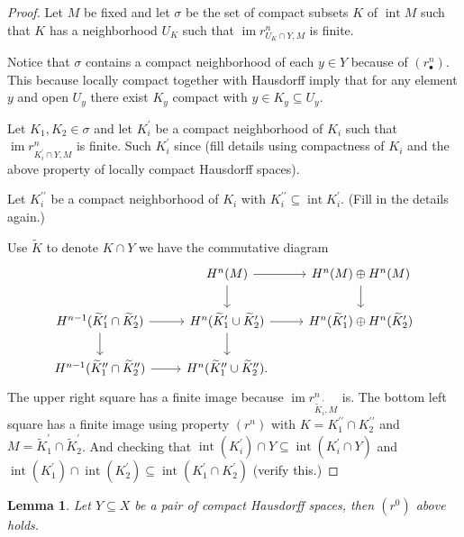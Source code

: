 \documentclass{amsart}
\newtheorem{lemma}[theorem]{Lemma}
\newcommand{\dprime}{{\prime\prime}}
\DeclareMathOperator{\im}{im}
\DeclareMathOperator{\interior}{int}
\begin{document}
	\begin{proof}
		Let $M$ be fixed and let $\sigma$ be the set of compact subsets $K$ of $\interior M$ such that $K$ has a neighborhood $U_K$ such that $\im r^n_{U_K \cap Y, M}$ is finite.
		
		Notice that $\sigma$ contains a compact neighborhood of each $y \in Y$ because of $(r^n_\bullet)$. This because locally compact together with Hausdorff imply that for any element $y$ and open $U_y$ there exist $K_y$ compact with $y \in K_y \subseteq U_y$.
		
		Let $K_1, K_2 \in \sigma$ and let $K_i^\prime$ be a compact neighborhood of $K_i$ such that $\im r^n_{K^\prime_i \cap Y, M}$ is finite. Such $K^\prime_i$ since (fill details using compactness of $K_i$ and the above property of locally compact Hausdorff spaces).
		
		Let $K_i^{\dprime}$ be a compact neighborhood of $K_i$ with $K_i^{\dprime} \subseteq \interior K_i^\prime$. (Fill in the details again.)
		
		Use $\widetilde{K}$ to denote $K \cap Y$ we have the commutative diagram
		\begin{equation*}
		\begin{tikzcd}
		& \arrow[r] \arrow[d] H^n(M) & H^n(M) \oplus H^n(M) \arrow[d] \\
		H^{n-1}(\widetilde K_1^\prime \cap \widetilde K_2^\prime) \arrow[r] \arrow[d] & 
		H^{n}(\widetilde K_1^\prime \cup \widetilde K_2^\prime) \arrow[r] \arrow[d] &
		H^{n}(\widetilde K_1^\prime) \oplus H^n(\widetilde K_2^\prime) \\
		H^{n-1}(\widetilde K_1^\dprime \cap \widetilde K_2^\dprime) \arrow[r] & 
		H^{n}(\widetilde K_1^\dprime \cup \widetilde K_2^\dprime). &
		\end{tikzcd}
		\end{equation*}
		The upper right square has a finite image because $\im r^n_{\widetilde K^\prime_i, M}$ is. The bottom left square has a finite image using property $(r^n)$ with $K = K_1^\dprime \cap K_2^\dprime$ and $M = \widetilde K_1^\prime \cap \widetilde K_2^\prime$. And checking that $\interior(K_i^\prime) \cap Y \subseteq \interior(K_i^\prime \cap Y)$ and $\interior(K_1^\prime) \cap \interior(K_2^\prime) \subseteq \interior(K_1^\prime \cap K_2^\prime)$ (verify this.)		
	\end{proof}

	\begin{lemma}
		Let $Y \subseteq X$ be a pair of compact Hausdorff spaces, then $(r^0)$ above holds. 
	\end{lemma}
\end{document}
